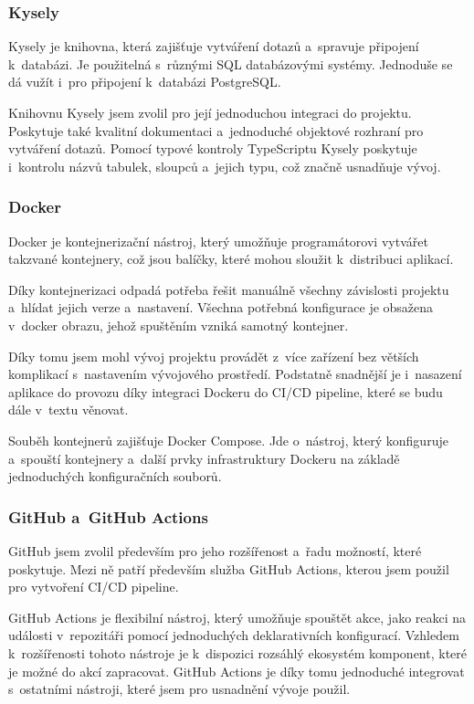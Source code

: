 \documentclass[
  tables=false,
  glossaries,
  index
]{kidiplom}
\begin{document}
\subsubsection{Kysely}
Kysely\cite{kysely} je knihovna, která zajišťuje vytváření dotazů a~spravuje připojení k~databázi. Je použitelná s~různými SQL databázovými systémy. Jednoduše se dá vužít i~pro připojení k~databázi PostgreSQL.

Knihovnu Kysely jsem zvolil pro její jednoduchou integraci do projektu. Poskytuje také kvalitní dokumentaci a~jednoduché objektové rozhraní pro vytváření dotazů. Pomocí typové kontroly TypeScriptu Kysely poskytuje i~kontrolu názvů tabulek, sloupců a~jejich typu, což značně usnadňuje vývoj.

\subsubsection{Docker}
Docker\cite{docker} je kontejnerizační nástroj, který umožňuje programátorovi vytvářet takzvané kontejnery, což jsou balíčky, které mohou sloužit k~distribuci aplikací.

Díky kontejnerizaci odpadá potřeba řešit manuálně všechny závislosti projektu a~hlídat jejich verze a~nastavení. Všechna potřebná konfigurace je obsažena v~docker obrazu, jehož spuštěním vzniká samotný kontejner.

Díky tomu jsem mohl vývoj projektu provádět z~více zařízení bez větších komplikací s~nastavením vývojového prostředí. Podstatně snadnější je i~nasazení aplikace do provozu díky integraci Dockeru do CI/CD pipeline, které se budu dále v~textu věnovat.

Souběh kontejnerů zajišťuje Docker Compose. Jde o~nástroj, který konfiguruje a~spouští kontejnery a~další prvky infrastruktury Dockeru na základě jednoduchých konfiguračních souborů.
\subsubsection{GitHub a~GitHub Actions}
GitHub jsem zvolil především pro jeho rozšířenost a~řadu možností, které poskytuje. Mezi ně patří především služba GitHub Actions, kterou jsem použil pro vytvoření CI/CD pipeline.

GitHub Actions\cite{github_actions} je flexibilní nástroj, který umožňuje spouštět akce, jako reakci na události v~repozitáři pomocí jednoduchých deklarativních konfigurací. Vzhledem k~rozšířenosti tohoto nástroje je k~dispozici rozsáhlý ekosystém komponent, které je možné do akcí zapracovat. GitHub Actions je díky tomu jednoduché integrovat s~ostatními nástroji, které jsem pro usnadnění vývoje použil.
\end{document}
